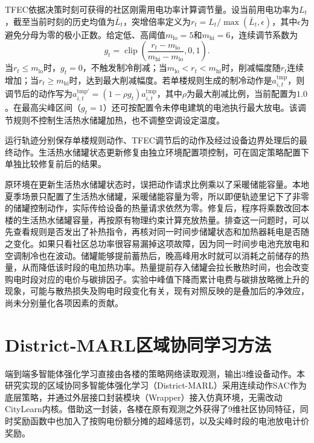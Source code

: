 TFEC依据决策时刻可获得的社区刚需用电功率计算调节量。设当前用电功率为$L_t$，截至当前时刻的历史均值为$\bar{L}_t$，突增倍率定义为$r_t=L_t/\max(\bar{L}_t,\epsilon)$，其中$\epsilon$为避免分母为零的极小正数。给定低、高阈值$m_{\mathrm{lo}}=5$和$m_{\mathrm{hi}}=6$，连续调节系数为
\begin{equation}
    \label{eq:tfec-gate}
    g_t=\operatorname{clip}\left(\frac{r_t-m_{\mathrm{lo}}}{m_{\mathrm{hi}}-m_{\mathrm{lo}}},0,1\right).
\end{equation}
当$r_t\leq m_{\mathrm{lo}}$时，$g_t=0$，不触发制冷削减；当$m_{\mathrm{lo}}<r_t<m_{\mathrm{hi}}$时，削减幅度随$r_t$连续增加；当$r_t\geq m_{\mathrm{hi}}$时，达到最大削减幅度。若单楼规则生成的制冷动作是$a_{i,t}^{\mathrm{tmp}}$，则调节后的动作写为$a_{i,t}^{\mathrm{tmp}\prime}=(1-\rho g_t)a_{i,t}^{\mathrm{tmp}}$，其中$\rho$为最大削减比例，当前配置为$1.0$。在最高尖峰区间（$g_t=1$）还可按配置令未停电建筑的电池执行最大放电。该调节规则不控制生活热水储罐加热，也不调整空调设定温度。

运行轨迹分别保存单楼规则动作、TFEC调节后的动作及经过设备边界处理后的最终动作。生活热水储罐状态更新修复由独立环境配置项控制，可在固定策略配置下单独比较修复前后的结果。

原环境在更新生活热水储罐状态时，误把动作请求比例乘以了采暖储能容量。本地夏季场景只配置了生活热水储罐，采暖储能容量为零，所以即便轨迹里记下了非零的储罐控制动作，实际传给设备的热量请求依然为零。修复后，程序将乘数改回本楼的生活热水储罐容量，再按原有物理约束计算充放热量。排查这一问题时，可以先查看规则是否发出了补热指令，再核对同一时间步储罐状态和加热器耗电是否随之变化。如果只看社区总功率很容易漏掉这项故障，因为同一时间步电池充放电和空调制冷也在波动。储罐能够提前蓄热后，晚高峰用水时就可以消耗之前储存的热量，从而降低该时段的电加热功率。热量提前存入储罐会拉长散热时间，也会改变购电时段对应的电价与碳排因子。实验中峰值下降而累计电费与碳排放略微上升的现象，可能与散热损失及购电时段变化有关，现有对照反映的是叠加后的净效应，尚未分别量化各项因素的贡献。

\section{District-MARL区域协同学习方法}\label{sec:district-marl}
端到端多智能体强化学习直接由各楼的策略网络读取观测，输出3维设备动作。本研究实现的区域协同多智能体强化学习（District-MARL）采用连续动作SAC作为底层策略，并通过外层接口封装模块（Wrapper）接入仿真环境，无需改动CityLearn内核。借助这一封装，各楼在原有观测之外获得了9维社区协同特征，同时奖励函数中也加入了按购电份额分摊的超峰惩罚，以及尖峰时段的电池放电计价奖励。

